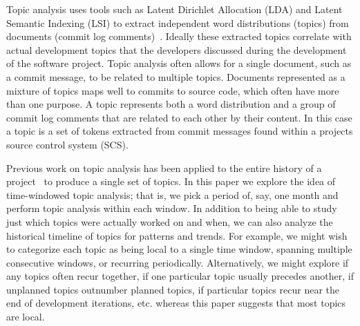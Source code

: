 \documentclass[times, 10pt,twocolumn]{article}
\begin{document}



Topic analysis 
uses tools such as Latent Dirichlet Allocation (LDA) and Latent Semantic Indexing (LSI) to extract
independent word distributions (topics) from
documents (commit log comments)~\cite{1374321-short,10.1109/ICPC.2007.13-short,lukins2008,10.1109/MSR.2007.20-short}.
Ideally these extracted topics 
correlate with actual development topics that the developers discussed
during the development of the software project. 
Topic analysis often allows for a single document, such as a commit
message, to be related to multiple topics. Documents represented as a mixture of topics maps well to commits
to source code, which often have more than one purpose.  A topic
represents both a word distribution and a group of commit log comments
that are related to each other by their content.  In this case a topic
is a set of tokens extracted from commit messages found within a
projects source control system (SCS). 


Previous work on topic analysis has been applied to the entire history of a 
project~\cite{1321709-short,lukins2008,10.1109/ICPC.2007.13-short}
to produce a single set of topics. In this paper we explore the idea
of time-windowed topic analysis; that is, we pick a period of, say,
one month and perform topic analysis within each window.  In addition
to being able to study just which topics were actually worked on and
when, we can also analyze the historical timeline of topics for
patterns and trends.  For example, we might wish to categorize each
topic as being local to a single time window, spanning multiple
consecutive windows, or recurring periodically.  Alternatively, we
might explore if any topics often recur together, if one particular
topic usually precedes another, if unplanned topics outnumber planned
topics, if particular topics recur near the end of development
iterations, etc.  whereas this paper suggests that most topics are
local.
\end{document}
